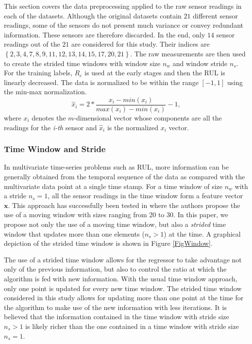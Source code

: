 \documentclass[preprint,12pt]{elsarticle}%
\begin{document}
This section covers the data preprocessing applied to the raw sensor readings
in each of the datasets. Although the original datasets contain $21$ different
sensor readings, some of the sensors do not present much variance or convey
redundant information. These sensors are therefore discarded. In the end, only
$14$ sensor readings out of the $21$ are considered for this study. Their
indices are $\left\lbrace 2, 3, 4, 7, 8, 9, 11, 12, 13, 14, 15, 17, 20, 21
\right\rbrace $. The raw measurements are then used to create the strided time
windows with window size $n_{w}$ and window stride $n_{s}$. For the training
labels, $R_{e}$ is used at the early stages and then the RUL is linearly
decreased. The data is normalized to be within the range $\left[  -1,1
\right]  $ using the min-max normalization.
\begin{equation}
\hat{x}_{i} = 2* \frac{x_{i} - min(x_{i})}{max(x_{i}) - min(x_{i})} - 1,
\label{eq:min_max_norm}%
\end{equation}
where $x_{i}$ denotes the $m$-dimensional vector whose components are all the
readings for the \textit{i-th} sensor and $\hat{x}_{i}$ is the normalized
$x_{i}$ vector.

\subsubsection{Time Window and Stride}

In multivariate time-series problems such as RUL, more information can be
generally obtained from the temporal sequence of the data as compared with the
multivariate data point at a single time stamp. For a time window of size
$n_{w}$ with a stride $n_{s}=1$, all the sensor readings in the time window
form a feature vector $\mathbf{x}$. This approach has successfully been tested
in \cite{Li2018,Lim2016} where the authors propose the use of a moving window
with sizes ranging from 20 to 30. In this paper, we propose not only the use of
a moving time window, but also a \textit{strided} time window that updates
more than one elements ($n_{s}>1$) at the time. A graphical depiction of the
strided time window is shown in Figure \ref{FigWindow}.

The use of a strided time window allows for the regressor to take advantage
not only of the previous information, but also to control the ratio at which
the algorithm is fed with new information. With the usual time window
approach, only one point is updated for every new time window. The strided
time window considered in this study allows for updating more than one point
at the time for the algorithm to make use of the new information with less iterations. It
is believed that the information contained in the time window with stride size
$n_{s}>1$ is likely richer than the one contained in a time window with stride
size $n_{s}=1$.
\end{document}
